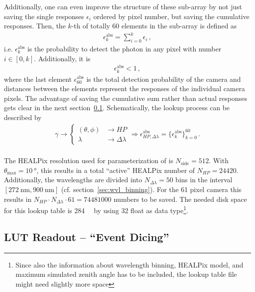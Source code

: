 Additionally, one can even improve the structure of these sub-array by not just saving the single responses $\epsilon_i$ ordered by pixel number, but saving the cumulative responses. Then, the $k$-th of totally \num{60} elements in the sub-array is defined as 
\begin{align}
	\epsilon^\text{abs}_k = \sum_{i=0}^{k} \epsilon_i\,,
	\label{eq:eps_cumulative}
\end{align}
i.e. $\epsilon^\text{abs}_k$ is the probability to detect the photon in any pixel with number $i\in[0,k]$. Additionally, it is
\begin{align}
\epsilon_k^\text{abs} < 1\,,
\end{align}
where the last element $\epsilon_{60}^\text{abs}$ is the total detection probability of the camera and distances between the elements represent the responses of the individual camera pixels. The advantage of saving the cumulative sum rather than actual responses gets clear in the next section~\ref{sec:lut_readout}. Schematically, the lookup process can be described by
\begin{align}
	\gamma \rightarrow
	\begin{cases}
		(\theta,\phi) & \rightarrow HP\\
		\lambda & \rightarrow \Delta\lambda
	\end{cases}
	\Rightarrow \epsilon^\text{abs}_{HP,\Delta\lambda} = \{\epsilon^\text{abs}_k\}_{k=0}^{60}\,.
\end{align}\\

The HEALPix resolution used for parameterization of \iceact is $N_\text{side}=\num{512}$. With $\theta_\text{max}=\SI{10}{\degree}$, this results in a total \enquote{active} HEALPix number of $N_{HP}=\num{24420}$. Additionally, the wavelengths are divided into $N_{\Delta\lambda} = \num{50}$ bins in the interval $[\SI{272}{\nano\meter},\SI{900}{\nano\meter}]$ (cf. section~\ref{sec:wvl_binning}). For the \num{61} pixel camera this results in $N_{HP}\cdot N_{\Delta\lambda}\cdot \num{61} = \num{74481000}$ numbers to be saved. The needed disk space for this lookup table is \SI{284}{\mebi\byte} by using \SI{32}{\bit} float as data type\footnote{Since also the information about wavelength binning, HEALPix model, and maximum simulated zenith angle has to be included, the lookup table file might need slightly more space}.

\subsection{LUT Readout -- \enquote{Event Dicing}}\label{sec:lut_readout}


